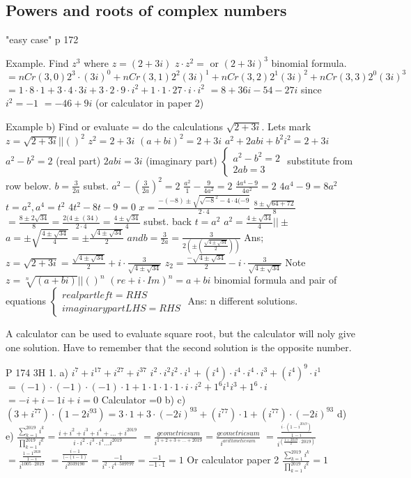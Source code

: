 \subsection{Powers and roots of complex numbers}
"easy case" p 172

Example. Find $z^3$ where $z=(2+3i)$
$z\cdot z^2=$ or $(2+3i)^3$ binomial formula.
$=nCr(3,0)2^3\cdot(3i)^0+nCr(3,1)2^2(3i)^1+nCr(3,2)2^1(3i)^2+nCr(3,3)2^0(3i)^3$
$=1\cdot 8\cdot 1+3\cdot 4\cdot 3i+3\cdot 2\cdot 9\cdot i^2+1\cdot 1\cdot 27\cdot i\cdot i^2$
$=8+36i-54-27i$ since $i^2=-1$
$=-46+9i$
(or calculator in paper 2)

Example b) Find or evaluate = do the calculations $\sqrt{2+3i}$.
Lets mark $z=\sqrt{2+3i} || ()^2$
$z^2=2+3i$
$(a+bi)^2=2+3i$
$a^2+2abi+b^2i^2=2+3i$
$a^2-b^2=2$ (real part)
$2abi=3i$ (imaginary part)
$\begin{cases}
a^2-b^2=2 \\ 2ab=3 \end{cases}$
substitute from row below.
$b=\frac{3}{2a}$ subst.
$a^2-(\frac{3}{2a})^2=2$
$\frac{a^2}{1}-\frac{9}{4a^2}=2$
$\frac{4a^4-9}{4a^2}=2$
$4a^4-9=8a^2$
$t=a^2,a^4=t^2$
$4t^2-8t-9=0$
$x=\frac{-(-8)\pm\sqrt{\sqrt{-8}^2-4\cdot 4(-9}}{2\cdot 4}$
$\frac{8\pm\sqrt{64+72}}{8}$
$=\frac{8\pm2\sqrt{34}}{8}=\frac{2(4\pm(34)}{2\cdot 4}=\frac{4\pm\sqrt{34}}{4}$
subst. back
$t=a^2$
$a^2=\frac{4\pm\sqrt{34}}{4} ||\pm$
$a=\pm\sqrt{\frac{4\pm\sqrt{34}}{4}}=\pm\frac{\sqrt{4\pm\sqrt{34}}}{2}$
$and b=\frac{3}{2a}=\frac{3}{2(\pm(\frac{\sqrt{4\pm\sqrt{34}}}{2}))}$
Ans; $z=\sqrt{2+3i}=\frac{\sqrt{4\pm\sqrt{34}}}{2}+i\cdot\frac{3}{\sqrt{4\pm\sqrt{34}}}$
$z_2=\frac{-\sqrt{4\pm\sqrt{34}}}{2}-i\cdot\frac{3}{\sqrt{4\pm\sqrt{34}}}$
Note
$z=\sqrt[n]{(a+bi)} || ()^n$
$(re+i\cdot Im)^n=a+bi$
binomial formula and pair of equations
$\begin{cases}real part left = RHS \\ imaginary part LHS = RHS\end{cases}$
Ans: n different solutions.

A calculator can be used to evaluate square root, but the calculator will noly give one solution. Have to remember that the second solution is the opposite number.

P 174 3H
1. a) $i^7 + i^17 + i^27 + i^37$
$i^2\cdot i^2i^2\cdot i^1+(i^4)\cdot i^4\cdot i^4\cdot i^3+(i^4)^9\cdot i^1$
$=(-1)\cdot(-1)\cdot(-1)\cdot 1+1\cdot 1\cdot 1\cdot 1 \cdot i \cdot i^2+1^6i^1i^3+1^6\cdot i$
$=-i +i -1i + i =0$
Calculator =0
b)
c) $(3+i^77)\cdot (1-2i^{93})=3\cdot 1+3\cdot (-2i)^{93}+(i^77)\cdot 1+(i^77)\cdot (-2i)^{93}$
d)
e) $\frac{\sum_{k=1}^{2019}i^k}{\prod_{k=1}^{2019}i^k}=\frac{i+i^2+i^3+i^4+...+i^2019}{i\cdot i^2\cdot i^3\cdot i^4...i^{2019}}$
$=\frac{geometric sum}{i^{1+2+3+...+2019}}=\frac{geometric sum}{i^{arithmetic sum}}$
$=\frac{\frac{i\cdot(1-i^{2019})}{1-i}}{i^{(\frac{1+2019}{2}\cdot2019)}}$
$=\frac{\frac{1-1^{2020}}{1-i}}{i^{1005\cdot 2019}}$
$=\frac{\frac{i-1}{(-(i-1)}}{i^{2039190}}=\frac{-1}{i^2\cdot i^{4\cdot 509797}}=\frac{-1}{-1\cdot 1}=1$
Or calculator paper 2 $\frac{\sum_{k=1}^{2019}i^k}{\prod_{k=1}^{2019}i^k}=1$

